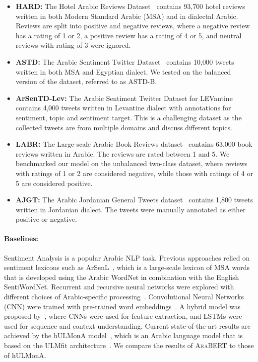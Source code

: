 \documentclass[10pt, a4paper]{article}
\begin{document}
\begin{itemize}
\item \textbf{HARD:} The Hotel Arabic Reviews Dataset~\cite{elnagar2018hotel} contains 93,700 hotel reviews written in both Modern Standard Arabic (MSA) and in dialectal Arabic.  Reviews are split into positive and negative reviews, where a negative review has a rating of 1 or 2, a positive review has a rating of 4 or 5, and neutral reviews with rating of 3 were ignored. 
\item \textbf{ASTD:}
The Arabic Sentiment Twitter Dataset~\cite{nabil-etal-2015-astd} contains 10,000 tweets written in both MSA and Egyptian dialect.  We tested on the balanced version of the dataset, referred to as ASTD-B.
\item \textbf{ArSenTD-Lev:}
The Arabic Sentiment Twitter Dataset for LEVantine~\cite{baly2018arsentd} contains 4,000 tweets written in Levantine dialect with annotations for sentiment, topic and sentiment target.  This is a challenging dataset as the collected tweets are from multiple domains and discuss different topics.
\item \textbf{LABR:}
The Large-scale Arabic Book Reviews dataset~\cite{aly-atiya-2013-labr} contains 63,000 book reviews written in Arabic.  The reviews are rated between 1 and 5.  We benchmarked our model on the unbalanced two-class dataset, where reviews with ratings of 1 or 2 are considered negative, while those with ratings of 4 or 5 are considered positive.
\item \textbf{AJGT:}
The Arabic Jordanian General Tweets dataset~\cite{alomari2017arabic} contains 1,800 tweets written in Jordanian dialect. The tweets were manually annotated as either positive or negative.
\end{itemize}

\paragraph{Baselines:} Sentiment Analysis is a popular Arabic NLP task.  Previous approaches relied on sentiment lexicons such as ArSenL~\cite{badaro2014large}, which is a large-scale lexicon of MSA words that is developed using the Arabic WordNet in combination with the English SentiWordNet.  Recurrent and recursive neural networks were explored with different choices of Arabic-specific processing~\cite{al2015deep,al2017aroma,baly2017sentiment}.  Convolutional Neural Networks (CNN) were trained with pre-trained word embeddings~\cite{dahou2019arabic}.  A hybrid model was proposed by~\cite{abu-farha-magdy-2019-mazajak}, where CNNs were used for feature extraction, and LSTMs were used for sequence and context understanding.  Current state-of-the-art results are achieved by the hULMonA model~\cite{eljundi2019hulmona}, which is an Arabic language model that is based on the ULMfit architecture~\cite{howard2018universal}.  We compare the results of \textsc{AraBERT} to those of hULMonA.
\end{document}
